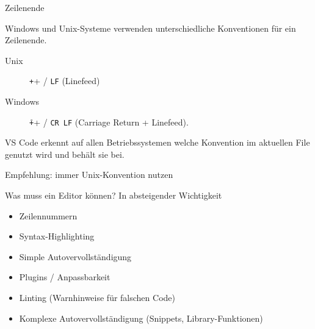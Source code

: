 \begin{frame}[c]{Zeilenende}

  Windows und Unix-Systeme verwenden unterschiedliche Konventionen für ein Zeilenende.

  \begin{description}
    \item[Unix] \texttt+\n+ / \texttt{LF} (Linefeed)
    \item[Windows] \texttt+\r\n+ / \texttt{CR LF} (Carriage Return + Linefeed).
  \end{description}

  VS Code erkennt auf allen Betriebssystemen welche Konvention im aktuellen File genutzt
  wird und behält sie bei.

  Empfehlung: immer Unix-Konvention nutzen

\end{frame}

\begin{frame}{Was muss ein Editor können?}
  In absteigender Wichtigkeit

  \begin{itemize}
    \item Zeilennummern
    \item Syntax-Highlighting
    \item Simple Autovervollständigung
    \item Plugins / Anpassbarkeit
    \item Linting (Warnhinweise für falschen Code)
    \item Komplexe Autovervollständigung (Snippets, Library-Funktionen)
  \end{itemize}
\end{frame}

